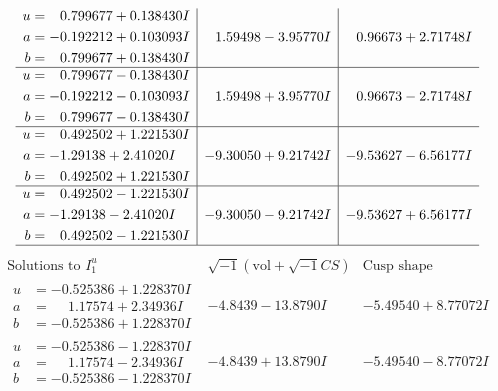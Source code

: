 \documentclass[1p]{elsarticle_modified}
\theoremstyle{definition}
\newcommand{\I}{\sqrt{-1}}
\begin{document}
$$\begin{array}{c|c|c}
\begin{aligned}
u &= \phantom{-}0.799677 + 0.138430 I \\
a &= -0.192212 + 0.103093 I \\
b &= \phantom{-}0.799677 + 0.138430 I\end{aligned}
 & \phantom{-}1.59498 - 3.95770 I & \phantom{-}0.96673 + 2.71748 I \\ \hline\begin{aligned}
u &= \phantom{-}0.799677 - 0.138430 I \\
a &= -0.192212 - 0.103093 I \\
b &= \phantom{-}0.799677 - 0.138430 I\end{aligned}
 & \phantom{-}1.59498 + 3.95770 I & \phantom{-}0.96673 - 2.71748 I \\ \hline\begin{aligned}
u &= \phantom{-}0.492502 + 1.221530 I \\
a &= -1.29138 + 2.41020 I \\
b &= \phantom{-}0.492502 + 1.221530 I\end{aligned}
 & -9.30050 + 9.21742 I & -9.53627 - 6.56177 I \\ \hline\begin{aligned}
u &= \phantom{-}0.492502 - 1.221530 I \\
a &= -1.29138 - 2.41020 I \\
b &= \phantom{-}0.492502 - 1.221530 I\end{aligned}
 & -9.30050 - 9.21742 I & -9.53627 + 6.56177 I\\
 \hline 
 \end{array}$$\newpage$$\begin{array}{c|c|c}  
\text{Solutions to }I^u_{1}& \I (\text{vol} + \sqrt{-1}CS) & \text{Cusp shape}\\
 \hline 
\begin{aligned}
u &= -0.525386 + 1.228370 I \\
a &= \phantom{-}1.17574 + 2.34936 I \\
b &= -0.525386 + 1.228370 I\end{aligned}
 & -4.8439 - 13.8790 I & -5.49540 + 8.77072 I \\ \hline\begin{aligned}
u &= -0.525386 - 1.228370 I \\
a &= \phantom{-}1.17574 - 2.34936 I \\
b &= -0.525386 - 1.228370 I\end{aligned}
 & -4.8439 + 13.8790 I & -5.49540 - 8.77072 I \\ \hline\begin{aligned}

\end{aligned}
\end{array}$$
\end{document}
